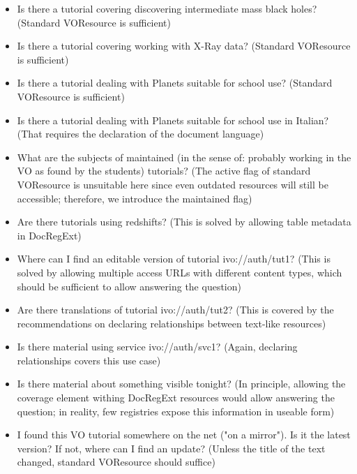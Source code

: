 \documentclass{ivoa}
\begin{document}
\begin{itemize}

\item Is there a tutorial covering discovering intermediate mass black
holes? (Standard VOResource is sufficient){}

\item Is there a tutorial covering working with X-Ray data? (Standard
VOResource is sufficient){}

\item Is there a tutorial dealing with Planets suitable for school use?
(Standard VOResource is sufficient){}

\item Is there a tutorial dealing with Planets suitable for school use in
Italian? (That requires the declaration of the document language){}

\item What are the subjects of maintained (in the sense of: probably
working in the VO as found by the students) tutorials?
(The active flag of standard VOResource is
unsuitable here since even outdated resources will still be accessible;
therefore, we introduce the maintained flag){}

\item Are there tutorials using redshifts? (This is solved by allowing
table metadata in DocRegExt){}

\item Where can I find an editable version of tutorial ivo://auth/tut1?
(This is solved by allowing multiple access URLs with different content
types, which should be sufficient to allow answering the question){}

\item Are there translations of tutorial ivo://auth/tut2? (This is covered
by the recommendations on declaring relationships between text-like
resources){}

\item Is there material using service ivo://auth/svc1? (Again, declaring
relationships covers this use case){}

\item Is there material about something visible tonight? (In principle,
allowing the coverage element withing DocRegExt resources would allow
answering the question; in reality, few registries expose this
information in useable form){}

\item I found this VO tutorial somewhere on the net ("on a mirror").  Is it
the latest version?  If not, where can I find an update? (Unless the
title of the text changed, standard VOResource should suffice){}

\end{itemize}
\end{document}
